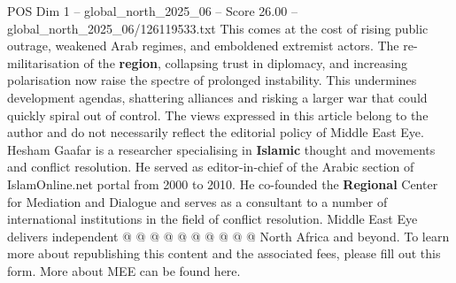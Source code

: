 \begin{textsample}{POS Dim 1 – global\_north\_2025\_06 – Score 26.00 – global\_north\_2025\_06/126119533.txt}
This comes at the cost of rising public outrage, weakened Arab regimes, and emboldened extremist actors.
The re-militarisation of the \textbf{region}, collapsing trust in diplomacy, and increasing polarisation now raise the spectre of prolonged instability.
This undermines development agendas, shattering alliances and risking a larger war that could quickly spiral out of control.
The views expressed in this article belong to the author and do not necessarily reflect the editorial policy of Middle East Eye.
Hesham Gaafar is a researcher specialising in \textbf{Islamic} thought and movements and conflict resolution.
He served as editor-in-chief of the Arabic section of IslamOnline.net portal from 2000 to 2010.
He co-founded the \textbf{Regional} Center for Mediation and Dialogue and serves as a consultant to a number of international institutions in the field of conflict resolution.
Middle East Eye delivers independent @ @ @ @ @ @ @ @ @ @ North Africa and beyond.
To learn more about republishing this content and the associated fees, please fill out this form.
More about MEE can be found here.

\end{textsample}
